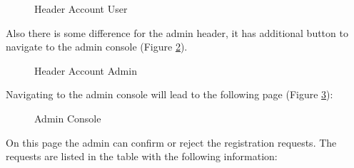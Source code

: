 \begin{figure}[H]
    \centering
    \caption{Header Account User}
    \label{header-account-user}
\end{figure}

Also there is some difference for the admin header, it has additional button to navigate to the admin console (Figure \ref{header-account-admin}).

\begin{figure}[H]
    \centering
    \caption{Header Account Admin}
    \label{header-account-admin}
\end{figure}

Navigating to the admin console will lead to the following page (Figure \ref{admin-console}):

\begin{figure}[H]
    \centering
    \caption{Admin Console}
    \label{admin-console}
\end{figure}

On this page the admin can confirm or reject the registration requests. The requests are listed in the table with the following information:

